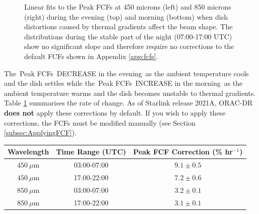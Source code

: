 \begin{figure}
\begin{center}
\caption[FCFs Time of Night Fits]{Linear fits to the Peak FCFs at 450 microns (left) and 850 microns (right)
 during the evening (top) and morning (bottom) when dish distortions caused by thermal gradients affect the 
 beam shape. The distributions during the stable part of the night (07:00-17:00 UTC) show no significant 
 slope and therefore require no corrections to the default FCFs shown in Appendix \ref{app:fcfs}. \label{fig:FCFsTimeOfNightFits}}
\end{center}
\end{figure}


The Peak FCFs DECREASE in the evening as the ambient temperature cools and the dish settles while 
the Peak FCFs INCREASE in the morning as the ambient temperature warms and the dish becomes 
unstable to thermal gradients. Table \ref{tab:FCFsTimeOfNight} summarises the rate of change. 
As of Starlink release 2021A, ORAC-DR \textbf{does not} apply these corrections by default. If
you wish to apply these corrections, the FCFs must be modified manually (see Section \ref{subsec:ApplyingFCF}).


\begin{table}[h!]
\begin{center}
\begin{tabular}{|c|c|c|}
 \hline
 \multicolumn{1}{|c|}{Wavelength} &
 \multicolumn{1}{c|}{Time Range (UTC)} &
 \multicolumn{1}{c|}{Peak FCF Correction (\% hr$^{-1}$)}
 \\ \hline
$450~\mu$m & 03:00-07:00 & $9.1\pm0.5$ \\
$450~\mu$m & 17:00-22:00 & $7.2\pm0.6$ \\
\hline
$850~\mu$m & 03:00-07:00 & $3.2\pm0.1$ \\
$850~\mu$m & 17:00-22:00 & $3.1\pm0.1$ \\ \hline
\end{tabular}
\end{center}
\label{tab:FCFsTimeOfNight}
\end{table}

